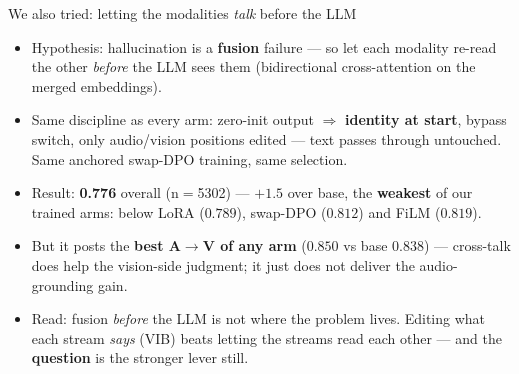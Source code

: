 \documentclass[aspectratio=169,11pt]{beamer}
\begin{document}
\begin{frame}{We also tried: letting the modalities \emph{talk} before the LLM}
\centering
{}
\vfill
\begin{itemize}\small
\item Hypothesis: hallucination is a \textbf{fusion} failure --- so let each modality re-read the
other \emph{before} the LLM sees them (bidirectional cross-attention on the merged embeddings).
\item Same discipline as every arm: zero-init output $\Rightarrow$ \textbf{identity at start},
bypass switch, only audio/vision positions edited --- text passes through untouched. Same anchored
swap-DPO training, same selection.
\item Result: \textbf{0.776} overall (n$=$5302) --- $+1.5$ over base, the \textbf{weakest} of our
trained arms: below LoRA ($0.789$), swap-DPO ($0.812$) and FiLM ($0.819$). %
\item But it posts the \textbf{best A$\to$V of any arm} ($0.850$ vs base $0.838$) --- cross-talk does
help the vision-side judgment; it just does not deliver the audio-grounding gain.
\item Read: fusion \emph{before} the LLM is not where the problem lives. Editing what each stream
\emph{says} (VIB) beats letting the streams read each other --- and the \textbf{question} is the
stronger lever still.
\end{itemize}
\end{frame}
\end{document}
